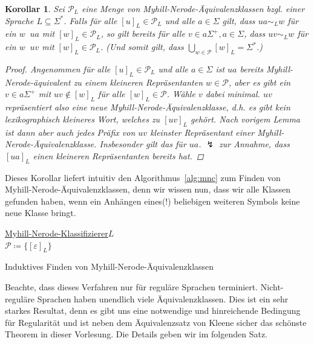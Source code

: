 \documentclass[11pt, a4paper]{article}
\theoremstyle{definition}
\theoremstyle{plain}
\newtheorem{corollary}[definition]{Korollar}
\numberwithin{equation}{section}
\DeclareMathOperator{\lex}{\prec_\text{lex}}
\begin{document}
\begin{corollary}
	Sei $\mathcal{P}_L$ eine Menge von Myhill-Nerode-Äquivalenzklassen bzgl. einer Sprache $L \subseteq \Sigma^\ast$. Falls für alle $[u]_L \in \mathcal{P}_L$ und alle $a \in \Sigma$ gilt, dass $ua \sim_L w$ für ein $w \lex ua$ mit $[w]_L \in \mathcal{P}_L$, so gilt bereits für alle $v \in a\Sigma^+, a \in \Sigma$, dass $uv \sim_L w$ für ein $w \lex uv$ mit $[w]_L \in \mathcal{P}_L$. (Und somit gilt, dass $\bigcup_{w \in \mathcal{P}} [w]_L = \Sigma^\ast$.)
	\begin{proof}
		Angenommen für alle $[u]_L\in \mathcal{P}_L$ und alle $a \in \Sigma$ ist $ua$ bereits Myhill-Nerode-äquivalent zu einem kleineren Repräsentanten $w \in \mathcal{P}$, aber es gibt ein $v \in a\Sigma^+$ mit $uv \notin [w]_L$ für alle $[w]_L \in \mathcal{P}$. Wähle $v$ dabei minimal. $uv$ repräsentiert also eine neue Myhill-Nerode-Äquivalenzklasse, d.h. es gibt kein lexikographisch kleineres Wort, welches zu $[uv]_L$ gehört. Nach vorigem Lemma ist dann aber auch jedes Präfix von $uv$ kleinster Repräsentant einer Myhill-Nerode-Äquivalenzklasse. Insbesonder gilt das für $ua$. $\lightning$ zur Annahme, dass $[ua]_L$ einen kleineren Repräsentanten bereits hat.
	\end{proof}
\end{corollary}
Dieses Korollar liefert intuitiv den Algorithmus~\ref{alg:mnc} zum Finden von Myhill-Nerode-Ä\-qui\-va\-lenz\-klas\-sen, denn wir wissen nun, dass wir alle Klassen gefunden haben, wenn ein Anhängen eines(!) beliebigen weiteren Symbols keine neue Klasse bringt.
\begin{algorithm}
	\underline{Myhill-Nerode-Klassifizierer}{$L$}\\
	$\mathcal{P} \coloneqq \{[\varepsilon]_L\}$\\
	\caption{Induktives Finden von Myhill-Nerode-Äquivalenzklassen}
	\label{alg:mnc}
\end{algorithm}
Beachte, dass dieses Verfahren nur für reguläre Sprachen terminiert. Nicht-reguläre Sprachen haben unendlich viele Äquivalenzklassen. Dies ist ein sehr starkes Resultat, denn es gibt uns eine notwendige und hinreichende Bedingung für Regularität und ist neben dem Äquivalenzsatz von Kleene sicher das schönste Theorem in dieser Vorlesung. Die Details geben wir im folgenden Satz.
\end{document}
